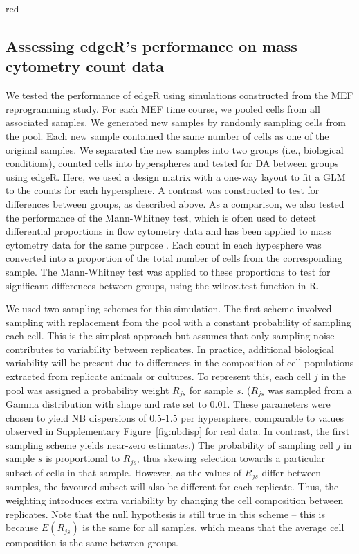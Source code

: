 \documentclass{article}
\begin{document}
\begin{color}{red}
\subsection{Assessing edgeR's performance on mass cytometry count data}
\label{sec:edgeRsim}
We tested the performance of edgeR using simulations constructed from the MEF reprogramming study.
For each MEF time course, we pooled cells from all associated samples.
We generated new samples by randomly sampling cells from the pool.
Each new sample contained the same number of cells as one of the original samples.
We separated the new samples into two groups (i.e., biological conditions), counted cells into hyperspheres and tested for DA between groups using edgeR.
Here, we used a design matrix with a one-way layout to fit a GLM to the counts for each hypersphere.
A contrast was constructed to test for differences between groups, as described above.
As a comparison, we also tested the performance of the Mann-Whitney test, which is often used to detect differential proportions in flow cytometry data \cite{watson1992significance} and has been applied to mass cytometry data for the same purpose \cite{behbehani2015mass}.
Each count in each hypesphere was converted into a proportion of the total number of cells from the corresponding sample.
The Mann-Whitney test was applied to these proportions to test for significant differences between groups, using the wilcox.test function in R.

We used two sampling schemes for this simulation.
The first scheme involved sampling with replacement from the pool with a constant probability of sampling each cell.
This is the simplest approach but assumes that only sampling noise contributes to variability between replicates.
In practice, additional biological variability will be present due to differences in the composition of cell populations extracted from replicate animals or cultures.
To represent this, each cell $j$ in the pool was assigned a probability weight $R_{js}$ for sample $s$.
($R_{js}$ was sampled from a Gamma distribution with shape and rate set to 0.01.
These parameters were chosen to yield NB dispersions of 0.5-1.5 per hypersphere, comparable to values observed in Supplementary Figure~\ref{fig:nbdisp} for real data.
In contrast, the first sampling scheme yields near-zero estimates.)
The probability of sampling cell $j$ in sample $s$ is proportional to $R_{js}$, thus skewing selection towards a particular subset of cells in that sample.
However, as the values of $R_{js}$ differ between samples, the favoured subset will also be different for each replicate.
Thus, the weighting introduces extra variability by changing the cell composition between replicates.
Note that the null hypothesis is still true in this scheme -- this is because $E(R_{js})$ is the same for all samples, which means that the average cell composition is the same between groups.


\end{color}
\end{document}

